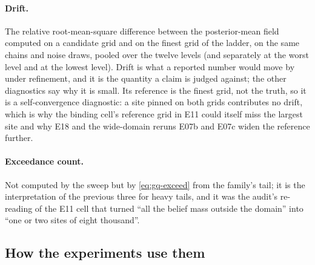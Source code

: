 \paragraph{Drift.}
The relative root-mean-square difference between the posterior-mean field computed on
a candidate grid and on the finest grid of the ladder, on the same chains and noise
draws, pooled over the twelve levels (and separately at the worst level and at the
lowest level). Drift is what a reported number would move by under refinement, and it
is the quantity a claim is judged against; the other diagnostics say why it is small.
Its reference is the finest grid, not the truth, so it is a self-convergence
diagnostic: a site pinned on both grids contributes no drift, which is why the
binding cell's reference grid in E11 could itself miss the largest site and why E18
and the wide-domain reruns E07b and E07c widen the reference further.

\paragraph{Exceedance count.}
Not computed by the sweep but by \cref{eq:gq-exceed} from the family's tail; it is the
interpretation of the previous three for heavy tails, and it was the audit's re-reading
of the E11 cell that turned ``all the belief mass outside the domain'' into ``one or two
sites of eight thousand''.

\subsection{How the experiments use them}

